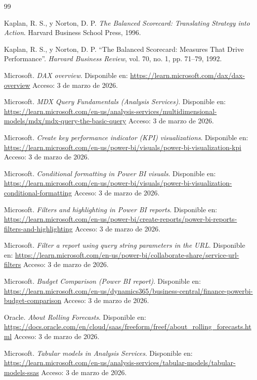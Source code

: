 \documentclass[12pt]{article}
\begin{document}
\newpage
\begin{thebibliography}{99}

Kaplan, R. S., y Norton, D. P.
\textit{The Balanced Scorecard: Translating Strategy into Action}.
Harvard Business School Press, 1996.

Kaplan, R. S., y Norton, D. P.
``The Balanced Scorecard: Measures That Drive Performance''.
\textit{Harvard Business Review}, vol. 70, no. 1, pp. 71--79, 1992.

Microsoft.
\textit{DAX overview}.
Disponible en: \url{https://learn.microsoft.com/dax/dax-overview}
Acceso: 3 de marzo de 2026.

Microsoft.
\textit{MDX Query Fundamentals (Analysis Services)}.
Disponible en: \url{https://learn.microsoft.com/en-us/analysis-services/multidimensional-models/mdx/mdx-query-the-basic-query}
Acceso: 3 de marzo de 2026.

Microsoft.
\textit{Create key performance indicator (KPI) visualizations}.
Disponible en: \url{https://learn.microsoft.com/en-us/power-bi/visuals/power-bi-visualization-kpi}
Acceso: 3 de marzo de 2026.

Microsoft.
\textit{Conditional formatting in Power BI visuals}.
Disponible en: \url{https://learn.microsoft.com/en-us/power-bi/visuals/power-bi-visualization-conditional-formatting}
Acceso: 3 de marzo de 2026.

Microsoft.
\textit{Filters and highlighting in Power BI reports}.
Disponible en: \url{https://learn.microsoft.com/en-us/power-bi/create-reports/power-bi-reports-filters-and-highlighting}
Acceso: 3 de marzo de 2026.

Microsoft.
\textit{Filter a report using query string parameters in the URL}.
Disponible en: \url{https://learn.microsoft.com/en-us/power-bi/collaborate-share/service-url-filters}
Acceso: 3 de marzo de 2026.

Microsoft.
\textit{Budget Comparison (Power BI report)}.
Disponible en: \url{https://learn.microsoft.com/en-us/dynamics365/business-central/finance-powerbi-budget-comparison}
Acceso: 3 de marzo de 2026.

Oracle.
\textit{About Rolling Forecasts}.
Disponible en: \url{https://docs.oracle.com/en/cloud/saas/freeform/freef/about_rolling_forecasts.html}
Acceso: 3 de marzo de 2026.

Microsoft.
\textit{Tabular models in Analysis Services}.
Disponible en: \url{https://learn.microsoft.com/en-us/analysis-services/tabular-models/tabular-models-ssas}
Acceso: 3 de marzo de 2026.

\end{thebibliography}
\end{document}
